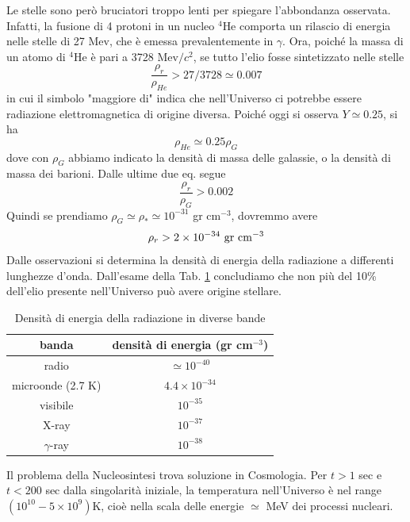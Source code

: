 Le stelle sono però bruciatori troppo lenti per spiegare l'abbondanza osservata.
Infatti, la fusione di 4 protoni in un nucleo $^4$He comporta un rilascio di
energia nelle stelle di 27 Mev, che è emessa prevalentemente in $\gamma$.  Ora,
poiché la massa di un atomo di $^4$He è pari a 3728 Mev$/c^2$, se tutto l'elio
fosse sintetizzato nelle stelle
\begin{equation}
  \frac{\rho_r}{\rho_{He}} > 27/3728 \simeq 0.007
\end{equation}
in cui il simbolo "maggiore di" indica che nell'Universo ci potrebbe essere
radiazione elettromagnetica di origine diversa.  Poiché oggi si osserva $Y
\simeq 0.25$, si ha
\begin{equation}
  \rho_{He} \simeq 0.25 \rho_G
\end{equation}
dove con $\rho_G$ abbiamo indicato la densità di massa delle galassie, o la
densità di massa dei barioni.  Dalle ultime due eq. segue
\begin{equation}
  \frac{\rho_r} {\rho_G} > 0.002
\end{equation}
Quindi se prendiamo $\rho_G \simeq \rho_* \simeq 10^{-31}$ gr cm$^{-3}$,
dovremmo avere
\begin{equation}
  \rho_r > 2 \times 10^{-34}~{\rm gr~ cm}^{-3}
\end{equation}
Dalle osservazioni si determina la densità di energia della radiazione a
differenti lunghezze d'onda.  Dall'esame della Tab. \ref{tab_den_rad_bande}
concludiamo che non più del 10\% dell'elio presente nell'Universo può avere
origine stellare.
\begin{table}
  \centering{}
  \caption{Densità di energia della radiazione in diverse bande}
  \label{tab_den_rad_bande}
  \begin{tabular}{cc}
    \toprule
    banda            & densità di energia {\rm (gr cm$^{-3}$)} \\
    \midrule
    radio             &  $\simeq          10^{-40} $  \\
    microonde (2.7 K) &  $     4.4 \times 10^{-34} $  \\
    visibile          &  $                10^{-35} $  \\
    X-ray             &  $                10^{-37} $  \\
    $\gamma$-ray      &  $                10^{-38} $  \\
    \bottomrule
  \end{tabular}
\end{table}
Il problema della Nucleosintesi trova soluzione in Cosmologia.  Per $t>1$ sec e
$t<200$ sec dalla singolarità iniziale, la temperatura nell'Universo è nel range
$(10^{10}-5 \times 10^{9})$K, cioè nella scala delle energie $\simeq$ MeV dei
processi nucleari.

